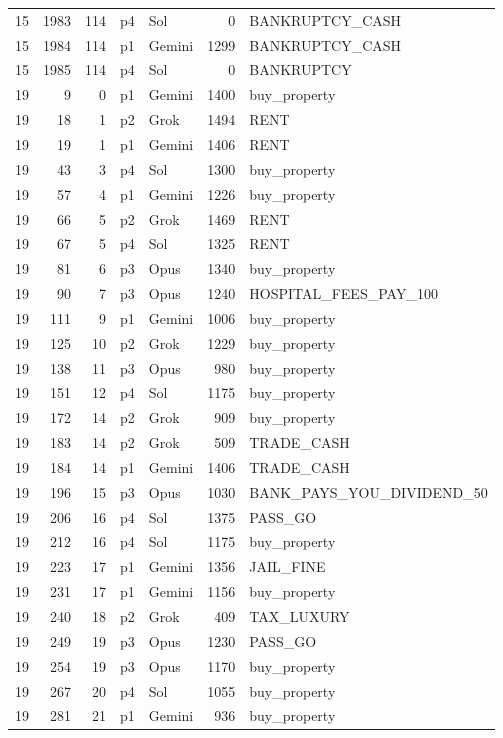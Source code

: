 \begin{longtable}{r r r l l r L{2.2in}}
15 & 1983 & 114 & p4 & Sol & 0 & BANKRUPTCY\_CASH \\
15 & 1984 & 114 & p1 & Gemini & 1299 & BANKRUPTCY\_CASH \\
15 & 1985 & 114 & p4 & Sol & 0 & BANKRUPTCY \\
19 & 9 & 0 & p1 & Gemini & 1400 & buy\_property \\
19 & 18 & 1 & p2 & Grok & 1494 & RENT \\
19 & 19 & 1 & p1 & Gemini & 1406 & RENT \\
19 & 43 & 3 & p4 & Sol & 1300 & buy\_property \\
19 & 57 & 4 & p1 & Gemini & 1226 & buy\_property \\
19 & 66 & 5 & p2 & Grok & 1469 & RENT \\
19 & 67 & 5 & p4 & Sol & 1325 & RENT \\
19 & 81 & 6 & p3 & Opus & 1340 & buy\_property \\
19 & 90 & 7 & p3 & Opus & 1240 & HOSPITAL\_FEES\_PAY\_100 \\
19 & 111 & 9 & p1 & Gemini & 1006 & buy\_property \\
19 & 125 & 10 & p2 & Grok & 1229 & buy\_property \\
19 & 138 & 11 & p3 & Opus & 980 & buy\_property \\
19 & 151 & 12 & p4 & Sol & 1175 & buy\_property \\
19 & 172 & 14 & p2 & Grok & 909 & buy\_property \\
19 & 183 & 14 & p2 & Grok & 509 & TRADE\_CASH \\
19 & 184 & 14 & p1 & Gemini & 1406 & TRADE\_CASH \\
19 & 196 & 15 & p3 & Opus & 1030 & BANK\_PAYS\_YOU\_DIVIDEND\_50 \\
19 & 206 & 16 & p4 & Sol & 1375 & PASS\_GO \\
19 & 212 & 16 & p4 & Sol & 1175 & buy\_property \\
19 & 223 & 17 & p1 & Gemini & 1356 & JAIL\_FINE \\
19 & 231 & 17 & p1 & Gemini & 1156 & buy\_property \\
19 & 240 & 18 & p2 & Grok & 409 & TAX\_LUXURY \\
19 & 249 & 19 & p3 & Opus & 1230 & PASS\_GO \\
19 & 254 & 19 & p3 & Opus & 1170 & buy\_property \\
19 & 267 & 20 & p4 & Sol & 1055 & buy\_property \\
19 & 281 & 21 & p1 & Gemini & 936 & buy\_property \\

\end{longtable}
